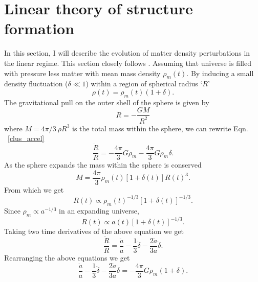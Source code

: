 \section{Linear theory of structure formation}
\label{growth}
In this section, I will describe the evolution of matter density perturbations in the linear regime. This section closely follows \citet{ryden_book}.
Assuming that universe is filled with pressure less matter with mean mass density $\rho_{m}(t)$. 
By inducing a small density fluctuation ($\delta \ll 1$) within a region of spherical radius `$R$'
\begin{equation}
\rho(t) = \rho_{m}(t)(1+\delta).
\end{equation}
 The gravitational pull on the outer shell of the sphere is given by%
\begin{equation}
\ddot{R} = -\frac{GM}{R^{2}}
\label{clus_accel}
\end{equation} 
where $M = 4 \pi /3 \: \rho R^{3}$ is the total mass within the sphere, we can rewrite Eqn. ~\ref{clus_accel}
\begin{equation}
\frac{\ddot{R}}{R}= -\frac{4\pi}{3} G\rho_{m} - \frac{4\pi}{3} G \rho_{m} \delta. 
\end{equation}
As the sphere expands the mass within the sphere is conserved
\begin{equation}
M = \frac{4\pi}{3} \rho_{m}(t)[1+\delta(t)]R(t)^{3}.
\end{equation}
From which we get 
\begin{equation}
R(t) \propto \rho_{m}(t)^{-1/3}[1+\delta(t)]^{-1/3}.
\end{equation}
Since $\rho_{m} \propto a^{-1/3}$ in an expanding universe,
\begin{equation}
R(t) \propto a(t)[1+\delta(t)]^{-1/3}.
\end{equation}
Taking two time derivatives of the above equation we get
\begin{equation}
\frac{\ddot{R}}{R}  = \frac{\ddot{a}}{a} - \frac{1}{3}\ddot{\delta} - \frac{2\dot{a}}{3a} \dot{\delta} .
\end{equation}
Rearranging the above equations we get 
\begin{equation}
\frac{\ddot{a}}{a} - \frac{1}{3}\ddot{\delta} - \frac{2\dot{a}}{3a} \dot{\delta} = -\frac{4 \pi}{3} G\rho_{m} (1+\delta).
\label{eq1}
\end{equation}
